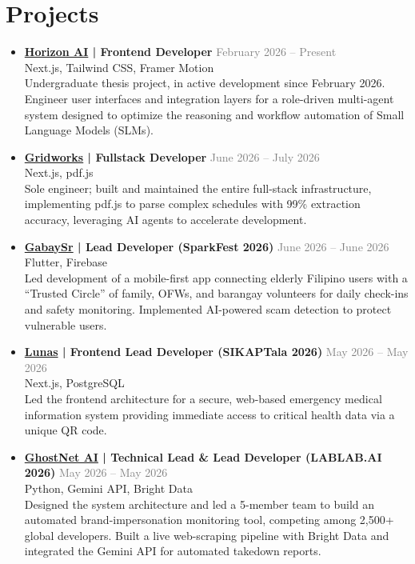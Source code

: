 \documentclass[a4paper,10pt]{article}
\newenvironment{compactlist}
    {
    \begin{itemize}[nosep,after=\strut, leftmargin=1em, itemsep=2pt, label=\textbullet]
    }
    {
    \end{itemize}
    }
\begin{document}
\section{Projects}
\begin{compactlist}
\item \textbf{\href{https://horizonai-zeta.vercel.app/}{Horizon AI} | Frontend Developer} \hfill \textcolor{gray}{February 2026 -- Present} \\
Next.js, Tailwind CSS, Framer Motion \\
Undergraduate thesis project, in active development since February 2026. Engineer user interfaces and integration layers for a role-driven multi-agent system designed to optimize the reasoning and workflow automation of Small Language Models (SLMs).
\item \textbf{\href{https://gridworks.vercel.app/}{Gridworks} | Fullstack Developer} \hfill \textcolor{gray}{June 2026 -- July 2026} \\
Next.js, pdf.js \\
Sole engineer; built and maintained the entire full-stack infrastructure, implementing pdf.js to parse complex schedules with 99\% extraction accuracy, leveraging AI agents to accelerate development.
\item \textbf{\href{https://sparkfest-nu.vercel.app/}{GabaySr} | Lead Developer (SparkFest 2026)} \hfill \textcolor{gray}{June 2026 -- June 2026} \\
Flutter, Firebase \\
Led development of a mobile-first app connecting elderly Filipino users with a ``Trusted Circle'' of family, OFWs, and barangay volunteers for daily check-ins and safety monitoring. Implemented AI-powered scam detection to protect vulnerable users.
\item \textbf{\href{https://lunas.software/}{Lunas} | Frontend Lead Developer (SIKAPTala 2026)} \hfill \textcolor{gray}{May 2026 -- May 2026} \\
Next.js, PostgreSQL \\
Led the frontend architecture for a secure, web-based emergency medical information system providing immediate access to critical health data via a unique QR code.
\item \textbf{\href{https://ghostnet-ai.vercel.app/}{GhostNet AI} | Technical Lead \& Lead Developer (LABLAB.AI 2026)} \hfill \textcolor{gray}{May 2026 -- May 2026} \\
Python, Gemini API, Bright Data \\
Designed the system architecture and led a 5-member team to build an automated brand-impersonation monitoring tool, competing among 2,500+ global developers. Built a live web-scraping pipeline with Bright Data and integrated the Gemini API for automated takedown reports.

\end{compactlist}
\end{document}
